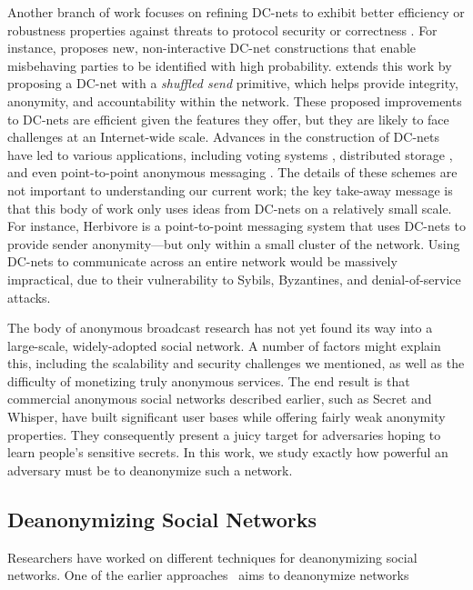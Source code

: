 \documentclass[10pt, twocolumn]{article}
\begin{document}
Another branch of work focuses on refining DC-nets to exhibit better efficiency or robustness properties against threats to protocol security or correctness \cite{waidner1989dining,golle2004dining,corrigan2010dissent}.
For instance, \cite{golle2004dining} proposes new, non-interactive DC-net constructions that enable misbehaving parties to be identified with high probability.
\cite{corrigan2010dissent} extends this work by proposing a DC-net with a \emph{shuffled send} primitive, which helps provide integrity, anonymity, and accountability within the network.
These proposed improvements to DC-nets are efficient given the features they offer, but they are likely to face challenges at an Internet-wide scale.
Advances in the construction of DC-nets have led to various applications, including voting systems \cite{fujioka1993practical,van2010anonymous}, distributed storage \cite{freeHavenProject}, and even point-to-point anonymous messaging \cite{goel2003herbivore}.
The details of these schemes are not important to understanding our current work; the key take-away message is that this body of work only uses ideas from DC-nets on a relatively small scale.
For instance, Herbivore \cite{goel2003herbivore} is a point-to-point messaging system that uses DC-nets to provide sender anonymity---but only within a small cluster of the network.
Using DC-nets to communicate across an entire network would be massively impractical, due to their vulnerability to Sybils, Byzantines, and denial-of-service attacks.

The body of anonymous broadcast research has not yet found its way into a large-scale, widely-adopted social network. 
A number of factors might explain this, including the scalability and security challenges we mentioned, as well as the difficulty of monetizing truly anonymous services.
The end result is that commercial anonymous social networks described earlier, such as Secret and Whisper, have built significant user bases while offering fairly weak anonymity properties.
They consequently present a juicy target for adversaries hoping to learn people's sensitive secrets.
In this work, we study exactly how powerful an adversary must be to deanonymize such a network.

\subsection{Deanonymizing Social Networks}
Researchers have worked on different techniques for deanonymizing social networks. One of the earlier approaches~\cite{backstrom2007wherefore} aims to deanonymize networks 
\end{document}
